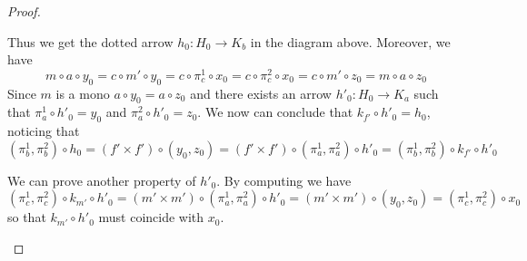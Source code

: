 \documentclass[a4paper,UKenglish,cleveref,pdftex,amsthm,thm-restate,numberwithinsect]{cas-sc}
\theoremstyle{plain}
\theoremstyle{definition}
\begin{document}
\begin{proof}
\begin{enumerate}
 Thus we get the dotted arrow $h_0\colon H_0\to K_b$ in the diagram above. Moreover, we have
 \[m\circ a\circ y_0=c\circ m'\circ y_0=c\circ \pi^1_c\circ x_0=c\circ \pi^2_c\circ x_0=c\circ m'\circ z_0=m\circ a \circ z_0\]
 Since $m$ is a mono $a\circ y_0=a\circ z_0$ and there exists an arrow $h'_0\colon H_0\to K_a$ such that $\pi^1_a\circ h'_0=y_0$ and $\pi^2_a\circ h'_0=z_0$. 
 We now can conclude that $k_{f'}\circ h'_0=h_0$, noticing that
 \[(\pi^1_b, \pi^2_b)\circ h_0=(f'\times f')\circ (y_0, z_0)=(f'\times f')\circ (\pi^1_a, \pi^2_a)\circ h'_0=(\pi^1_b, \pi^2_b)\circ k_{f'}\circ h'_0\]

We can prove another property of $h'_0$. By computing we have
\[(\pi^1_c, \pi^2_c)\circ k_{m'}\circ h'_0=(m'\times m')\circ (\pi^1_a, \pi^2_a)\circ h'_0=(m'\times m')\circ (y_0, z_0)=(\pi^1_c, \pi^2_c)\circ x_0\]
so that $k_{m'}\circ h'_0$ must coincide with $x_0$.


\end{enumerate}
\end{proof}
\end{document}
